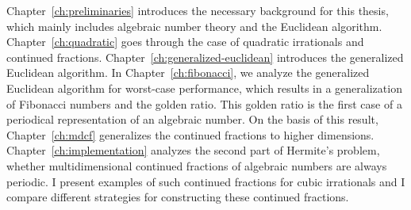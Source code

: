 Chapter~\ref{ch:preliminaries} introduces the necessary background for this thesis,
which mainly includes algebraic number theory and the Euclidean algorithm.
Chapter~\ref{ch:quadratic} goes through the case of quadratic irrationals
and continued fractions.
Chapter~\ref{ch:generalized-euclidean} introduces the generalized Euclidean algorithm.
In Chapter~\ref{ch:fibonacci}, we analyze the generalized Euclidean algorithm for worst-case performance,
which results in a generalization of Fibonacci numbers and the golden ratio.
This golden ratio is the first case of a periodical representation of an algebraic number.
On the basis of this result, Chapter~\ref{ch:mdcf} generalizes the continued fractions to higher dimensions.
Chapter~\ref{ch:implementation} analyzes the second part of Hermite's problem,
whether multidimensional continued fractions of algebraic numbers are always periodic.
I present examples of such continued fractions for cubic irrationals and I
compare different strategies for constructing these continued fractions.
